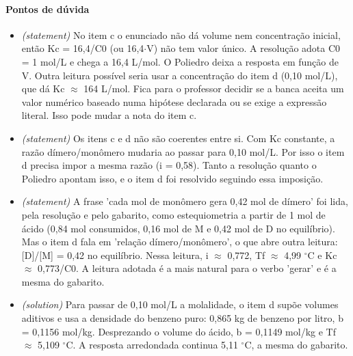 \documentclass{article}%
\begin{document}
\paragraph{Pontos de dúvida}%
\begin{itemize}%
\item%
\textit{(statement)} No item c o enunciado não dá volume nem concentração inicial, então Kc = 16,4/C0 (ou 16,4$\cdot$V) não tem valor único. A resolução adota C0 = 1 mol/L e chega a 16,4 L/mol. O Poliedro deixa a resposta em função de V. Outra leitura possível seria usar a concentração do item d (0,10 mol/L), que dá Kc $\approx$ 164 L/mol. Fica para o professor decidir se a banca aceita um valor numérico baseado numa hipótese declarada ou se exige a expressão literal. Isso pode mudar a nota do item c.%
\item%
\textit{(statement)} Os itens c e d não são coerentes entre si. Com Kc constante, a razão dímero/monômero mudaria ao passar para 0,10 mol/L. Por isso o item d precisa impor a mesma razão (i = 0,58). Tanto a resolução quanto o Poliedro apontam isso, e o item d foi resolvido seguindo essa imposição.%
\item%
\textit{(statement)} A frase 'cada mol de monômero gera 0,42 mol de dímero' foi lida, pela resolução e pelo gabarito, como estequiometria a partir de 1 mol de ácido (0,84 mol consumidos, 0,16 mol de M e 0,42 mol de D no equilíbrio). Mas o item d fala em 'relação dímero/monômero', o que abre outra leitura: {[}D{]}/{[}M{]} = 0,42 no equilíbrio. Nessa leitura, i $\approx$ 0,772, Tf $\approx$ 4,99 $^\circ$C e Kc $\approx$ 0,773/C0. A leitura adotada é a mais natural para o verbo 'gerar' e é a mesma do gabarito.%
\item%
\textit{(solution)} Para passar de 0,10 mol/L a molalidade, o item d supõe volumes aditivos e usa a densidade do benzeno puro: 0,865 kg de benzeno por litro, b = 0,1156 mol/kg. Desprezando o volume do ácido, b = 0,1149 mol/kg e Tf $\approx$ 5,109 $^\circ$C. A resposta arredondada continua 5,11 $^\circ$C, a mesma do gabarito.%
\end{itemize}%
\end{document}
